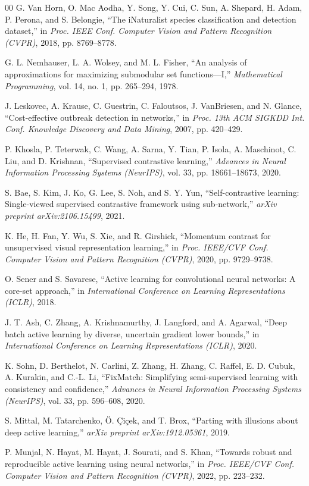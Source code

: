 \documentclass[conference]{IEEEtran}
\begin{document}
\begin{thebibliography}{00}
 G. Van Horn, O. Mac Aodha, Y. Song, Y. Cui, C. Sun, A. Shepard, H. Adam, P. Perona, and S. Belongie, ``The iNaturalist species classification and detection dataset,'' in \emph{Proc. IEEE Conf. Computer Vision and Pattern Recognition (CVPR)}, 2018, pp. 8769--8778.

 G. L. Nemhauser, L. A. Wolsey, and M. L. Fisher, ``An analysis of approximations for maximizing submodular set functions---I,'' \emph{Mathematical Programming}, vol. 14, no. 1, pp. 265--294, 1978.

 J. Leskovec, A. Krause, C. Guestrin, C. Faloutsos, J. VanBriesen, and N. Glance, ``Cost-effective outbreak detection in networks,'' in \emph{Proc. 13th ACM SIGKDD Int. Conf. Knowledge Discovery and Data Mining}, 2007, pp. 420--429.

 P. Khosla, P. Teterwak, C. Wang, A. Sarna, Y. Tian, P. Isola, A. Maschinot, C. Liu, and D. Krishnan, ``Supervised contrastive learning,'' \emph{Advances in Neural Information Processing Systems (NeurIPS)}, vol. 33, pp. 18661--18673, 2020.

 S. Bae, S. Kim, J. Ko, G. Lee, S. Noh, and S. Y. Yun, ``Self-contrastive learning: Single-viewed supervised contrastive framework using sub-network,'' \emph{arXiv preprint arXiv:2106.15499}, 2021.

 K. He, H. Fan, Y. Wu, S. Xie, and R. Girshick, ``Momentum contrast for unsupervised visual representation learning,'' in \emph{Proc. IEEE/CVF Conf. Computer Vision and Pattern Recognition (CVPR)}, 2020, pp. 9729--9738.

 O. Sener and S. Savarese, ``Active learning for convolutional neural networks: A core-set approach,'' in \emph{International Conference on Learning Representations (ICLR)}, 2018.

 J. T. Ash, C. Zhang, A. Krishnamurthy, J. Langford, and A. Agarwal, ``Deep batch active learning by diverse, uncertain gradient lower bounds,'' in \emph{International Conference on Learning Representations (ICLR)}, 2020.

 K. Sohn, D. Berthelot, N. Carlini, Z. Zhang, H. Zhang, C. Raffel, E. D. Cubuk, A. Kurakin, and C.-L. Li, ``FixMatch: Simplifying semi-supervised learning with consistency and confidence,'' \emph{Advances in Neural Information Processing Systems (NeurIPS)}, vol. 33, pp. 596--608, 2020.

 S. Mittal, M. Tatarchenko, \"O. \c{C}i\c{c}ek, and T. Brox, ``Parting with illusions about deep active learning,'' \emph{arXiv preprint arXiv:1912.05361}, 2019.

 P. Munjal, N. Hayat, M. Hayat, J. Sourati, and S. Khan, ``Towards robust and reproducible active learning using neural networks,'' in \emph{Proc. IEEE/CVF Conf. Computer Vision and Pattern Recognition (CVPR)}, 2022, pp. 223--232.

\end{thebibliography}
\end{document}
